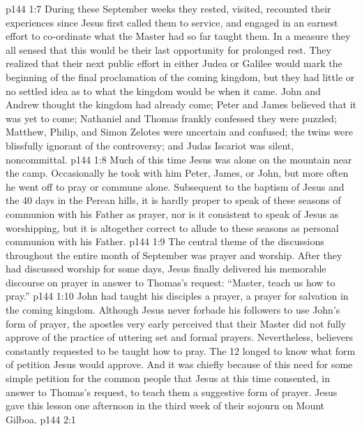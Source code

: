 \vs p144 1:7 During these September weeks they rested, visited, recounted their experiences since Jesus first called them to service, and engaged in an earnest effort to co\hyp{}ordinate what the Master had so far taught them. In a measure they all sensed that this would be their last opportunity for prolonged rest. They realized that their next public effort in either Judea or Galilee would mark the beginning of the final proclamation of the coming kingdom, but they had little or no settled idea as to what the kingdom would be when it came. John and Andrew thought the kingdom had already come; Peter and James believed that it was yet to come; Nathaniel and Thomas frankly confessed they were puzzled; Matthew, Philip, and Simon Zelotes were uncertain and confused; the twins were blissfully ignorant of the controversy; and Judas Iscariot was silent, noncommittal.
\vs p144 1:8 \pc Much of this time Jesus was alone on the mountain near the camp. Occasionally he took with him Peter, James, or John, but more often he went off to pray or commune alone. Subsequent to the baptism of Jesus and the 40 days in the Perean hills, it is hardly proper to speak of these seasons of communion with his Father as prayer, nor is it consistent to speak of Jesus as worshipping, but it is altogether correct to allude to these seasons as personal communion with his Father.
\vs p144 1:9 The central theme of the discussions throughout the entire month of September was prayer and worship. After they had discussed worship for some days, Jesus finally delivered his memorable discourse on prayer in answer to Thomas’s request: “Master, teach us how to pray.”
\vs p144 1:10 John had taught his disciples a prayer, a prayer for salvation in the coming kingdom. Although Jesus never forbade his followers to use John’s form of prayer, the apostles very early perceived that their Master did not fully approve of the practice of uttering set and formal prayers. Nevertheless, believers constantly requested to be taught how to pray. The 12 longed to know what form of petition Jesus would approve. And it was chiefly because of this need for some simple petition for the common people that Jesus at this time consented, in answer to Thomas’s request, to teach them a suggestive form of prayer. Jesus gave this lesson one afternoon in the third week of their sojourn on Mount Gilboa.
\vs p144 2:1 
